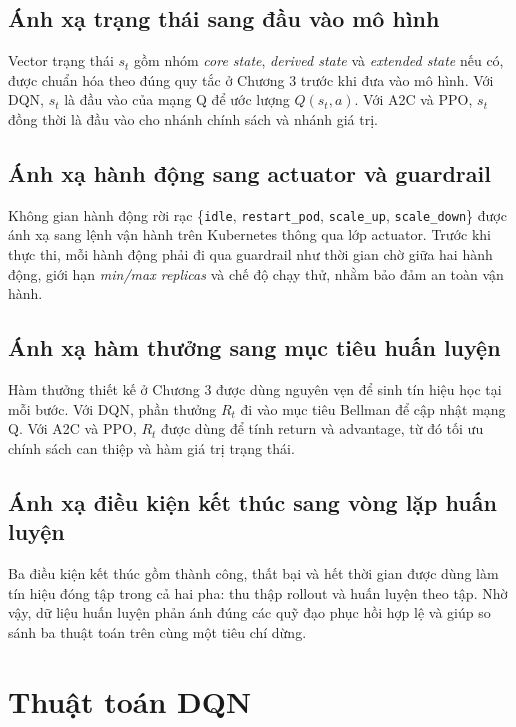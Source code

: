 \subsection{Ánh xạ trạng thái sang đầu vào mô hình}

\noindent Vector trạng thái $s_t$ gồm nhóm \textit{core state}, \textit{derived state} và \textit{extended state} nếu có, được chuẩn hóa theo đúng quy tắc ở Chương 3 trước khi đưa vào mô hình. Với DQN, $s_t$ là đầu vào của mạng Q để ước lượng $Q(s_t,a)$. Với A2C và PPO, $s_t$ đồng thời là đầu vào cho nhánh chính sách và nhánh giá trị.

\subsection{Ánh xạ hành động sang actuator và guardrail}

\noindent Không gian hành động rời rạc \{\texttt{idle}, \texttt{restart\_pod}, \texttt{scale\_up}, \texttt{scale\_down}\} được ánh xạ sang lệnh vận hành trên Kubernetes thông qua lớp actuator. Trước khi thực thi, mỗi hành động phải đi qua guardrail như thời gian chờ giữa hai hành động, giới hạn \textit{min/max replicas} và chế độ chạy thử, nhằm bảo đảm an toàn vận hành.

\subsection{Ánh xạ hàm thưởng sang mục tiêu huấn luyện}

\noindent Hàm thưởng thiết kế ở Chương 3 được dùng nguyên vẹn để sinh tín hiệu học tại mỗi bước. Với DQN, phần thưởng $R_t$ đi vào mục tiêu Bellman để cập nhật mạng Q. Với A2C và PPO, $R_t$ được dùng để tính return và advantage, từ đó tối ưu chính sách can thiệp và hàm giá trị trạng thái.

\subsection{Ánh xạ điều kiện kết thúc sang vòng lặp huấn luyện}

\noindent Ba điều kiện kết thúc gồm thành công, thất bại và hết thời gian được dùng làm tín hiệu đóng tập trong cả hai pha: thu thập rollout và huấn luyện theo tập. Nhờ vậy, dữ liệu huấn luyện phản ánh đúng các quỹ đạo phục hồi hợp lệ và giúp so sánh ba thuật toán trên cùng một tiêu chí dừng.

\section{Thuật toán DQN}

